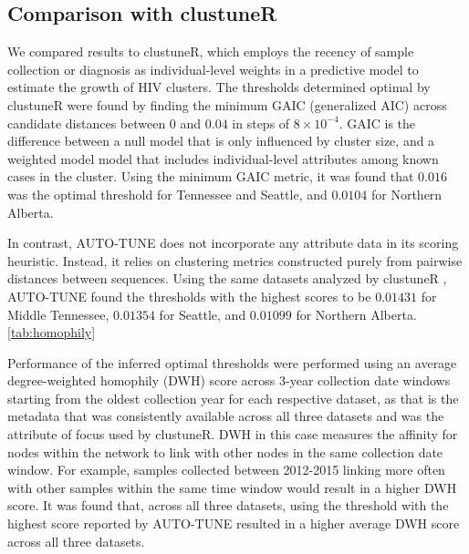 \documentclass[utf8]{FrontiersinHarvard} %
\begin{document}
\subsection{Comparison with clustuneR}

We compared results to clustuneR, which employs the recency of sample
collection or diagnosis as individual-level weights in a predictive model to
estimate the growth of HIV clusters. The thresholds determined optimal by
clustuneR were found by finding the minimum GAIC (generalized AIC) across
candidate distances between $0$ and $0.04$ in steps of $8 \times 10^{-4}$. GAIC is
the difference between a null model that is only influenced by cluster size,
and a weighted model model that includes individual-level attributes among
known cases in the cluster. Using the minimum GAIC metric, it was found that
$0.016$ was the optimal threshold for Tennessee and Seattle, and $0.0104$ for
Northern Alberta.

In contrast, AUTO-TUNE does not incorporate any attribute data in its scoring
heuristic. Instead, it relies on clustering metrics constructed purely from
pairwise distances between sequences. Using the same datasets analyzed by
clustuneR \cite{chato_public_2020}, AUTO-TUNE found the thresholds with the
highest scores to be $0.01431$ for Middle Tennessee, $0.01354$ for Seattle, and
$0.01099$ for Northern Alberta. \autoref{tab:homophily} 

Performance of the inferred optimal thresholds were performed using an average
degree-weighted homophily (DWH) score across 3-year collection date windows
starting from the oldest collection year for each respective dataset, as that
is the metadata that was consistently available across all three datasets and
was the attribute of focus used by clustuneR. DWH in this case measures the
affinity for nodes within the network to link with other nodes in the same
collection date window. For example, samples collected between 2012-2015
linking more often with other samples within the same time window would result
in a higher DWH score. It was found that, across all three datasets, using the
threshold with the highest score reported by AUTO-TUNE resulted in a higher
average DWH score across all three datasets. 
\end{document}
